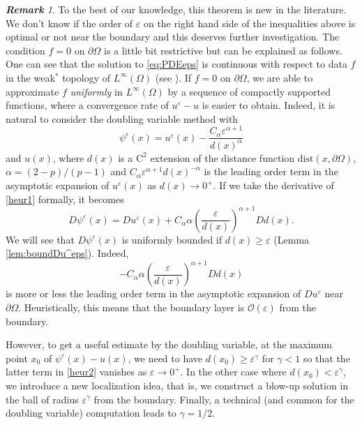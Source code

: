 \documentclass[12pt,reqno]{amsart}
\numberwithin{figure}{section}
\theoremstyle{plain}
\theoremstyle{remark}
\newtheorem{rem}{\bf{Remark}}
\numberwithin{equation}{section}
\begin{document}
\begin{rem} To the best of our knowledge, this theorem is new in the literature. We don't know if the order of $\varepsilon$ on the right hand side of the inequalities above is optimal or not near the boundary and this deserves further investigation. The condition $f = 0$ on $\partial\Omega$ is a little bit restrictive but can be explained as follows. One can see that the solution to \eqref{eq:PDEeps} is continuous with respect to data $f$ in the weak$^*$ topology of $L^\infty(\Omega)$ (see \cite{Lasry1989}). If $f = 0$ on $\partial\Omega$, we are able to approximate $f$ \emph{uniformly} in $L^\infty(\Omega)$ by a sequence of compactly supported functions, where a convergence rate of $u^\varepsilon-u$ is easier to obtain. Indeed, it is natural to consider the doubling variable method with
\begin{equation}\label{heur1}
    \psi^\varepsilon(x) =  u^\varepsilon(x) - \frac{C_\alpha\varepsilon^{\alpha+1}}{d(x)^{\alpha}}
\end{equation}
and $u(x)$, where $d(x)$ is a $\mathrm{C}^2$ extension of the distance function $\mathrm{dist}(x,\partial\Omega)$, $\alpha = (2-p)/(p-1)$ and $C_\alpha\varepsilon^{\alpha+1}d(x)^{-\alpha}$ is the leading order term in the asymptotic expansion of $u^\varepsilon(x)$ as $d(x) \to 0^{+}$. If we take the derivative of \eqref{heur1} formally, it becomes
\begin{equation}\label{heur2}
    D\psi^\varepsilon(x) =  Du^\varepsilon(x) + C_\alpha\alpha \left(\frac{\varepsilon}{d(x)}\right)^{\alpha+1}Dd(x).
\end{equation}
We will see that $D\psi^\varepsilon(x)$ is uniformly bounded if $d(x)\geq \varepsilon$ (Lemma \ref{lem:boundDu^eps}). Indeed, 
\begin{equation*}
    -C_\alpha \alpha \left(\frac{\varepsilon}{d(x)}\right)^{\alpha+1}Dd(x)    
\end{equation*}
is more or less the leading order term in the asymptotic expansion of $Du^\varepsilon$ near $\partial\Omega$. Heuristically, this means that the boundary layer is $\mathcal{O}(\varepsilon)$ from the boundary. 

However, to get a useful estimate by the doubling variable, at the maximum point $x_0$ of $\psi^\varepsilon(x) - u(x)$, we need to have $d(x_0)\geq \varepsilon^{\gamma}$ for $\gamma<1$ so that the latter term in \eqref{heur2} vanishes as $\varepsilon\to 0^+$. In the other case where $d(x_0) < \varepsilon^{\gamma}$, we introduce a new localization idea, that is, we construct a blow-up solution in the ball of radius $\varepsilon^\gamma$ from the boundary. Finally, a technical (and common for the doubling variable) computation leads to $\gamma = 1/2$.



\end{rem}
\end{document}
